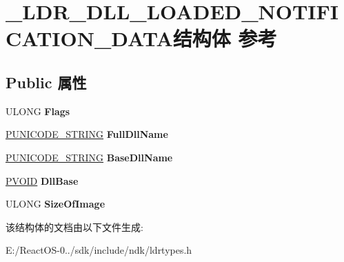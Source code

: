 \hypertarget{struct___l_d_r___d_l_l___l_o_a_d_e_d___n_o_t_i_f_i_c_a_t_i_o_n___d_a_t_a}{}\section{\+\_\+\+L\+D\+R\+\_\+\+D\+L\+L\+\_\+\+L\+O\+A\+D\+E\+D\+\_\+\+N\+O\+T\+I\+F\+I\+C\+A\+T\+I\+O\+N\+\_\+\+D\+A\+T\+A结构体 参考}
\label{struct___l_d_r___d_l_l___l_o_a_d_e_d___n_o_t_i_f_i_c_a_t_i_o_n___d_a_t_a}
\subsection*{Public 属性}
\begin{DoxyCompactItemize}
\item 
\mbox{\label{struct___l_d_r___d_l_l___l_o_a_d_e_d___n_o_t_i_f_i_c_a_t_i_o_n___d_a_t_a_a5f09b4fa79136446c28d2adaf3d713eb}} 
U\+L\+O\+NG {\bfseries Flags}
\item 
\mbox{\label{struct___l_d_r___d_l_l___l_o_a_d_e_d___n_o_t_i_f_i_c_a_t_i_o_n___d_a_t_a_a767b06a7390209ec4560a857c5a71631}} 
\hyperlink{struct___u_n_i_c_o_d_e___s_t_r_i_n_g}{P\+U\+N\+I\+C\+O\+D\+E\+\_\+\+S\+T\+R\+I\+NG} {\bfseries Full\+Dll\+Name}
\item 
\mbox{\label{struct___l_d_r___d_l_l___l_o_a_d_e_d___n_o_t_i_f_i_c_a_t_i_o_n___d_a_t_a_a92ab9dcd2e93378d3d5dbc2fc32121a8}} 
\hyperlink{struct___u_n_i_c_o_d_e___s_t_r_i_n_g}{P\+U\+N\+I\+C\+O\+D\+E\+\_\+\+S\+T\+R\+I\+NG} {\bfseries Base\+Dll\+Name}
\item 
\mbox{\label{struct___l_d_r___d_l_l___l_o_a_d_e_d___n_o_t_i_f_i_c_a_t_i_o_n___d_a_t_a_a6c515e0b98decc0afec1e409c569c9c6}} 
\hyperlink{interfacevoid}{P\+V\+O\+ID} {\bfseries Dll\+Base}
\item 
\mbox{\label{struct___l_d_r___d_l_l___l_o_a_d_e_d___n_o_t_i_f_i_c_a_t_i_o_n___d_a_t_a_a516f0c5617d522fc7da2403325755d49}} 
U\+L\+O\+NG {\bfseries Size\+Of\+Image}
\end{DoxyCompactItemize}


该结构体的文档由以下文件生成\+:\begin{DoxyCompactItemize}
\item 
E\+:/\+React\+O\+S-\/0../sdk/include/ndk/ldrtypes.\+h\end{DoxyCompactItemize}
